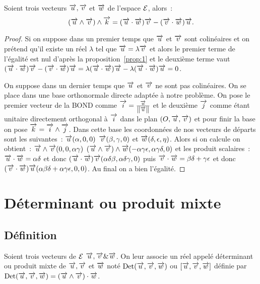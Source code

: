 \begin{prop}
  Soient trois vecteurs \(\vu, \vv\) et \(\vw\) de l'espace \(\E\), alors~:
  \begin{equation}
    (\vu\wedge\vv)\wedge\vk = (\vu\cdot\vw)\vv - (\vv\cdot\vw)\vu.
  \end{equation}
\end{prop}

\begin{proof}
  Si on suppose dans un premier temps que \(\vu\) et \(\vv\) sont colinéaires 
  et on prétend qu'il existe un réel \(\lambda\) tel que \(\vu = \lambda\vv\) 
  et alors le premier terme de l'égalité est nul d'après la 
  proposition~\ref{prop:1} et le deuxième terme vaut \((\vu\cdot\vw)\vv - 
  (\vv\cdot\vw)\vu = \lambda(\vu\cdot\vw)\vu - \lambda(\vu\cdot\vw)\vu = 0\).

  On suppose dans un dernier temps que \(\vu\) et \(\vv\) ne sont pas 
  colinéaires. On se place dans une base orthonormale directe adaptée à notre 
  problème. On pose le premier vecteur de la BOND comme \(\vi = 
  \frac{\vu}{\norme{\vu}}\) et le deuxième \(\vj\) comme étant unitaire 
  directement orthogonal à \(\vi\) dans le plan \((O, \vu, \vv)\) et pour 
  finir la base on pose \(\vk = \vi\wedge\vj\). Dans cette base les 
  coordonnées de nos vecteurs de départs sont les suivantes~: \(\vu(\alpha, 0, 
  0)\) \(\vv(\beta, \gamma, 0)\) et \(\vw(\delta, \epsilon, \eta)\). Alors si 
  on calcule on obtient~: \(\vu\wedge\vv(0, 0, \alpha\gamma)\) 
  \((\vu\wedge\vv)\wedge\vw(-\alpha\gamma\epsilon, \alpha\gamma\delta, 0)\) et 
  les produit scalaires~: \(\vu\cdot\vw = \alpha\delta\) et donc 
  \((\vu\cdot\vw)\vv(\alpha\delta\beta, \alpha\delta\gamma, 0)\) puis 
  \(\vv\cdot\vw = \beta\delta + \gamma\epsilon\) et donc 
  \((\vv\cdot\vw)\vu(\alpha\beta\delta + \alpha\gamma\epsilon, 0, 0)\). Au 
  final on a bien l'égalité.
\end{proof}

\section{Déterminant ou produit mixte}
\subsection{Définition}

\begin{defdef}
  Soient trois vecteurs de \(\E\) \(\vu, \vv \& \vw\). On leur associe un réel 
  appelé déterminant ou produit mixte de \(\vu, \vv\) et \(\vw\) noté 
  \(\Det(\vu, \vv, \vw)\) ou \([\vu, \vv, \vw]\) définie par \(\Det(\vu, \vv, 
  \vw) = (\vu\wedge\vv)\cdot\vw\).
\end{defdef}

